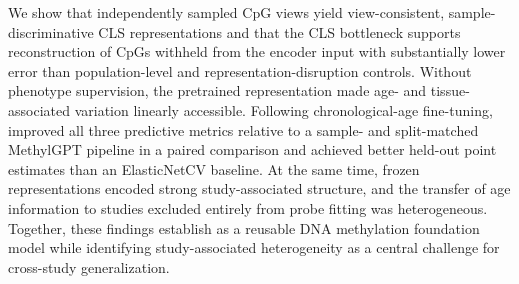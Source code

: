 We show that independently sampled CpG views yield view-consistent, sample-discriminative CLS
representations and that the CLS bottleneck supports reconstruction of CpGs withheld from the
encoder input with substantially lower error than population-level and representation-disruption
controls. Without phenotype supervision, the pretrained representation made age- and
tissue-associated variation linearly accessible. Following chronological-age fine-tuning,
\method{} improved all three predictive metrics relative to a sample- and split-matched
MethylGPT pipeline in a paired comparison and achieved better held-out point estimates than an
ElasticNetCV baseline. At
the same time, frozen representations encoded strong study-associated structure, and the transfer
of age information to studies excluded entirely from probe fitting was heterogeneous. Together,
these findings establish \method{} as a reusable DNA methylation foundation model while
identifying study-associated heterogeneity as a central challenge for cross-study generalization.

